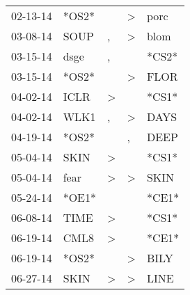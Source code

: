 \begin{supertabular}{p{0.07\textwidth}p{0.06\textwidth}p{0.02\textwidth}p{0.02\textwidth}p{0.06\textwidth}}
          02-13-14\textsuperscript{} &                            *OS2* &                  &     \textgreater &           porc\textsuperscript{} \\
          03-08-14\textsuperscript{} &           SOUP\textsuperscript{} &                , &     \textgreater &           blom\textsuperscript{} \\
          03-15-14\textsuperscript{} &           dsge\textsuperscript{} &                , &                  &                            *CS2* \\
          03-15-14\textsuperscript{} &                            *OS2* &                  &     \textgreater &           FLOR\textsuperscript{} \\
          04-02-14\textsuperscript{} &           ICLR\textsuperscript{} &     \textgreater &                  &                            *CS1* \\
          04-02-14\textsuperscript{} &           WLK1\textsuperscript{} &                , &     \textgreater &           DAYS\textsuperscript{} \\
          04-19-14\textsuperscript{} &                            *OS2* &                  &                , &           DEEP\textsuperscript{} \\
          05-04-14\textsuperscript{} &           SKIN\textsuperscript{} &     \textgreater &                  &                            *CS1* \\
          05-04-14\textsuperscript{} &           fear\textsuperscript{} &     \textgreater &     \textgreater &           SKIN\textsuperscript{} \\
          05-24-14\textsuperscript{} &                            *OE1* &                  &                  &                            *CE1* \\
          06-08-14\textsuperscript{} &           TIME\textsuperscript{} &     \textgreater &                  &                            *CS1* \\
          06-19-14\textsuperscript{} &           CML8\textsuperscript{} &     \textgreater &                  &                            *CE1* \\
          06-19-14\textsuperscript{} &                            *OS2* &                  &     \textgreater &           BILY\textsuperscript{} \\
          06-27-14\textsuperscript{} &           SKIN\textsuperscript{} &     \textgreater &     \textgreater &           LINE\textsuperscript{} \\

\end{supertabular}
